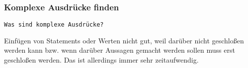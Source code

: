 \subsubsection{Komplexe Ausdrücke finden}
\begin{verbatim}
Was sind komplexe Ausdrücke?
\end{verbatim}


Einfügen von Statements oder Werten nicht gut, weil darüber nicht geschloßen werden kann bzw. wenn darüber Aussagen gemacht werden sollen muss erst geschloßen werden. Das ist allerdings immer sehr zeitaufwendig.